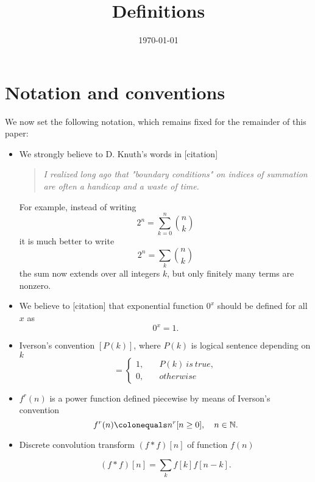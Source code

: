 \documentclass[12pt, letterpaper]{amsart}
\title{Definitions}
\date{\today}
\theoremstyle{definition}
\theoremstyle{remark}
\newenvironment{myitemize}
{ \begin{itemize}
    \setlength{\itemsep}{4pt}
    \setlength{\parskip}{4pt}
    \setlength{\parsep}{4pt}     }
{ \end{itemize}                  }
\numberwithin{equation}{section}
\begin{document}
\section{Notation and conventions}
We now set the following notation, which remains fixed for the remainder of this paper:

\begin{myitemize}
\item We strongly believe to D. Knuth's words in [citation]
\begin{quote}
\textit{I  realized long ago that "boundary conditions" on indices of summation are often a handicap and a waste of time.}
\end{quote}
For example, instead of writing
\begin{equation*}
2^n=\sum_{k=0}^n \binom{n}{k}
\end{equation*}
it is much better to write
\begin{equation*}
2^n=\sum_{k} \binom{n}{k}
\end{equation*}
the sum now extends over all integers $k$, but only finitely many terms are nonzero.

\item We believe to [citation] that exponential function $0^x$ should be defined for all $x$  as
\begin{equation*}
0^x = 1.
\end{equation*}

\item Iverson's convention $[P(k)]$, where $P(k)$ is logical sentence depending on $k$
\begin{equation*}
[P(k)] =
\begin{cases}
1, &\quad P(k) \ is \ true, \\
0, &\quad otherwise
\end{cases}
\end{equation*}

\item $f^{r}(n)$ is a power function defined piecewise by means of Iverson's convention
\begin{equation*}
f^{r}(n) \colonequals n^r[n\geq 0], \quad n\in\mathbb{N}.
\end{equation*}

\item Discrete convolution transform $(f\ast f)[n]$ of function $f(n)$

\begin{equation*}
(f\ast f)[n]=\sum_{k}f[k]f[n-k].
\end{equation*}


\end{myitemize}
\end{document}
